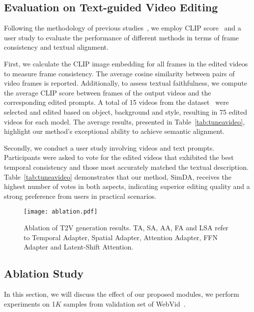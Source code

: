 \subsection{Evaluation on Text-guided Video Editing}
Following the methodology of previous studies~\cite{tuneavideo}, we employ CLIP score~\cite{clip} and a user study to evaluate the performance of different methods in terms of frame consistency and textual alignment.

First, we calculate the CLIP image embedding for all frames in the edited videos to measure frame consistency. The average cosine similarity between pairs of video frames is reported. Additionally, to assess textual faithfulness, we compute the average CLIP score between frames of the output videos and the corresponding edited prompts. A total of 15 videos from the dataset~\cite{davis} were selected and edited based on object, background and style, resulting in 75 edited videos for each model. 
The average results, presented in Table~\ref{tab:tuneavideo}, highlight our method's exceptional ability to achieve semantic alignment. 

Secondly, we conduct a user study involving videos and text prompts. Participants were asked to vote for the edited videos that exhibited the best temporal consistency and those most accurately matched the textual description. Table~\ref{tab:tuneavideo} demonstrates that our method, SimDA, receives the highest number of votes in both aspects, indicating superior editing quality and a strong preference from users in practical scenarios.

\begin{figure}
    \centering
    \texttt{[image: ablation.pdf]}
    \caption{Ablation of T2V generation results. TA, SA, AA, FA and LSA refer to Temporal Adapter, Spatial Adapter, Attention Adapter, FFN Adapter and Latent-Shift Attention. }
    \label{fig:ablation}
\end{figure}

\subsection{Ablation Study}
\label{sec:ablation}
In this section, we will discuss the effect of our proposed modules, we perform experiments on 1$K$ samples from validation set of WebVid~\cite{webvid}.

